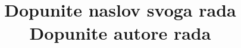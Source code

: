 \documentclass[a4paper]{report}
\newcommand{\odgovor}[1]{\textcolor{blue}{#1}}
\begin{document}
\title{Dopunite naslov svoga rada\\ \small{Dopunite autore rada}}

\maketitle

\tableofcontents

%
%
%
%
%
%
\end{document}
